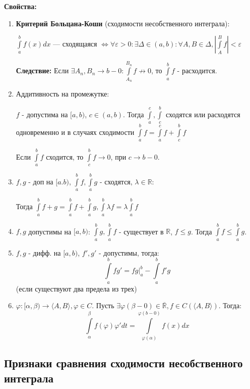 \documentclass{article}
\newcommand{\integral}[2]{\displaystyle\int\limits_{#1}^{#2}}
\begin{document}
\textbf{Свойства:}
\begin{enumerate}
    \item \textbf{Критерий Больцана-Коши} (сходимости несобственного интеграла):
  
  $\integral{a}{b}f(x)dx$ --- сходящаяся $\Leftrightarrow \forall \varepsilon >0:\exists \Delta \in (a,b): \forall A,B\in \Delta,  |\integral{A}{B}f|< \varepsilon$
  

  \textbf{Следствие:} Если $\exists A_n,B_n \rightarrow b-0: \integral{A_n}{B_n}f \not \rightarrow 0$, то $\integral{a}{b}f$ - расходится.

  \item Аддитивность на промежутке:

$f$ - допустима на $[a,b)$, $c \in (a,b)$. Тогда $\integral{a}{c}, \integral{c}{b}$ сходятся или расходятся одновременно и в случаях сходимости $\integral{a}{b}f = \integral{a}{c}f + \integral{c}{b}f$

Если $\integral{a}{b}f$ сходится, то $\integral{c}{b} f \rightarrow 0$, при $c\rightarrow b - 0$.

\item $f,g$ - доп на $[a.b)$, $\integral{a}{b}f,\integral{a}{b}g$ - сходятся, $\lambda\in \mathbb{R}:$

Тогда $\integral{a}{b}f +g = \integral{a}{b}f + \integral{a}{b}g, \integral{a}{b}\lambda f = \lambda \integral{a}{b}f$

\item  $f,g$ допустимы на $[a,b)$: $\integral{a}{b}g,\integral{a}{b}f$ - существует в $\mathbb{R}$, $f\leq g$. Тогда $\integral{a}{b}f \leq \integral{a}{b}g$.

\item $f,g$ - дифф. на $[a,b)$, $f',g'$ - допустимы, тогда:
$$\integral{a}{b}fg' = fg\Big|_a^b - \integral{a}{b}f'g$$
(если существуют два предела из трех)

\item $\varphi: [\alpha, \beta) \rightarrow \langle A, B \rangle, \varphi \in C.$ Пусть $\exists \varphi(\beta-0)\in \overline{\mathbb{R}}, f\in C(\langle A,B\rangle)$. Тогда:
$$\integral{\alpha}{\beta}f(\varphi)\varphi'dt = \integral{\varphi(\alpha)}{\varphi(b-0)}f(x) dx$$

\end{enumerate}


\subsection{Признаки сравнения сходимости несобственного интеграла}
\end{document}
